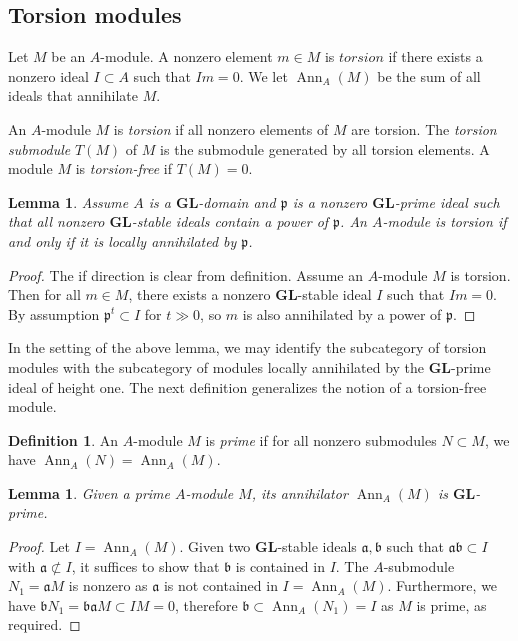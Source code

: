 \documentclass[12pt]{amsart}
\newcommand{\fa}{\mathfrak{a}}
\newcommand{\fb}{\mathfrak{b}}
\newcommand{\fp}{\mathfrak{p}}
\DeclareMathOperator{\Ann}{Ann}
\newcommand{\GL}{\mathbf{GL}}
\numberwithin{equation}{section}
\newtheorem{lemma}[equation]{Lemma}
\theoremstyle{definition}
\newtheorem{defn}[equation]{Definition}
\theoremstyle{plain}
\begin{document}
\subsection{Torsion modules}\label{ss:torsion}
Let $M$ be an $A$-module. A nonzero element $m \in M$ is $\textit{torsion}$ if there exists a nonzero ideal $I \subset A$ such that $Im = 0$.  We let $\Ann_A(M)$ be the sum of all ideals that annihilate $M$.

An $A$-module $M$ is \textit{torsion} if all nonzero elements of $M$ are torsion. The \textit{torsion submodule} $T(M)$ of $M$ is the submodule generated by all torsion elements. A module $M$ is \textit{torsion-free} if $T(M) = 0$.

\begin{lemma}\label{lem:minprimetors}
    Assume $A$ is a $\GL$-domain and $\fp$ is a nonzero $\GL$-prime ideal such that all nonzero $\GL$-stable ideals contain a power of $\fp$. An $A$-module is torsion if and only if it is locally annihilated by $\fp$.
\end{lemma}
\begin{proof}
The if direction is clear from definition. Assume an $A$-module $M$ is torsion. Then for all $m \in M$, there exists a nonzero $\GL$-stable ideal $I$ such that $Im = 0$. By assumption $\fp^t \subset I$ for $t \gg 0$, so $m$ is also annihilated by a power of $\fp$.
\end{proof}
In the setting of the above lemma, we may identify the subcategory of torsion modules with the subcategory of modules locally annihilated by the $\GL$-prime ideal of height one. The next definition generalizes the notion of a torsion-free module.
\begin{defn}
An $A$-module $M$ is \textit{prime} if for all nonzero submodules $N \subset M$, we have $\Ann_A(N) = \Ann_A(M)$.
\end{defn}

\begin{lemma}\label{lem:primeprime}
    Given a prime $A$-module $M$, its annihilator $\Ann_A(M)$ is $\GL$-prime.
\end{lemma}
\begin{proof}
    Let $I = \Ann_A(M)$. Given two $\GL$-stable ideals $\fa, \fb$ such that $\fa \fb \subset I$ with $\fa \not\subset I$, it suffices to show that $\fb$ is contained in $I$. The $A$-submodule $N_1 = \fa M$ is nonzero as $\fa$ is not contained in $I = \Ann_A(M)$. Furthermore, we have $\fb N_1 = \fb \fa M \subset IM = 0$, therefore $\fb \subset \Ann_A(N_1) = I$ as $M$ is prime, as required. 
\end{proof}
\end{document}
